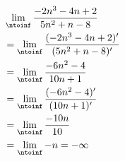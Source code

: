 
\begin{align}
    &\lim_{\ntoinf}\frac{-2n^3 - 4n + 2}{5n^2 + n - 8} \\
    &= \lim_{\ntoinf}\frac{(-2n^3 - 4n + 2)'}{(5n^2 + n - 8)'} \\
    &= \lim_{\ntoinf}\frac{-6n^2 - 4}{10n + 1} \\
    &= \lim_{\ntoinf}\frac{(-6n^2 - 4)'}{(10n + 1)'} \\
    &= \lim_{\ntoinf}\frac{-10n}{10} \\ 
    &= \lim_{\ntoinf}-n = -\infty
\end{align}


\pagebreak

